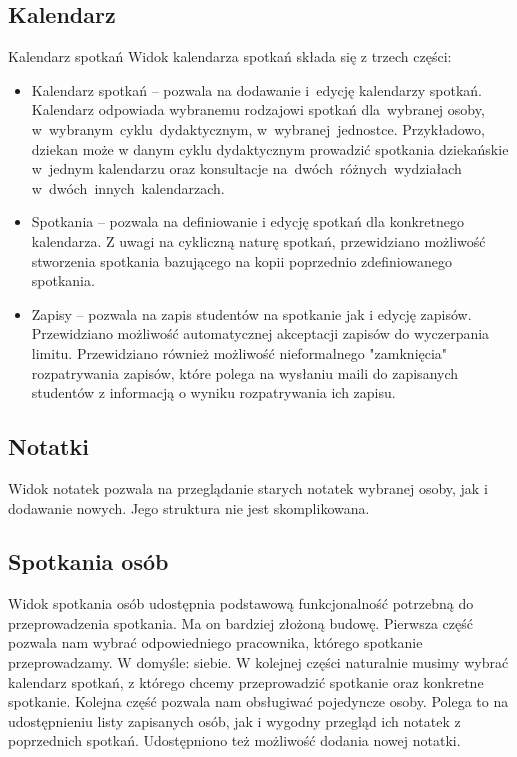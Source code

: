 \documentclass[licencjacka]{pracamgr}
\begin{document}
\subsection{Kalendarz}
Kalendarz spotkań
Widok kalendarza spotkań składa się z trzech części:

\begin{itemize}
\item Kalendarz spotkań -- pozwala na dodawanie i~edycję kalendarzy spotkań. Kalendarz odpowiada wybranemu rodzajowi spotkań dla~wybranej osoby, w~wybranym~cyklu~dydaktycznym, w~wybranej~jednostce. Przykładowo, dziekan może w danym cyklu dydaktycznym prowadzić spotkania dziekańskie w~jednym kalendarzu oraz konsultacje na~dwóch~różnych~wydziałach w~dwóch~innych~kalendarzach.
\item Spotkania -- pozwala na definiowanie i edycję spotkań dla konkretnego kalendarza. Z uwagi na cykliczną naturę spotkań, przewidziano możliwość stworzenia spotkania bazującego na kopii poprzednio zdefiniowanego spotkania.
\item Zapisy --  pozwala na zapis studentów na spotkanie jak i edycję zapisów. Przewidziano możliwość automatycznej akceptacji zapisów do wyczerpania limitu. Przewidziano również możliwość nieformalnego "zamknięcia" rozpatrywania zapisów, które polega na wysłaniu maili do zapisanych studentów z informacją o wyniku rozpatrywania ich zapisu.
\end{itemize}

\subsection{Notatki}
Widok notatek pozwala na przeglądanie starych notatek wybranej osoby, jak i dodawanie nowych. Jego struktura nie jest skomplikowana.

\subsection{Spotkania osób}
Widok spotkania osób udostępnia podstawową funkcjonalność potrzebną do przeprowadzenia spotkania. Ma on bardziej złożoną budowę.
Pierwsza część pozwala nam wybrać odpowiedniego pracownika, którego spotkanie przeprowadzamy. W domyśle: siebie.
W kolejnej części naturalnie musimy wybrać kalendarz spotkań, z którego chcemy przeprowadzić spotkanie oraz konkretne spotkanie.
Kolejna część pozwala nam obsługiwać pojedyncze osoby. Polega to na udostępnieniu listy zapisanych osób, jak i wygodny przegląd ich notatek z poprzednich spotkań. Udostępniono też możliwość dodania nowej notatki.
\end{document}
